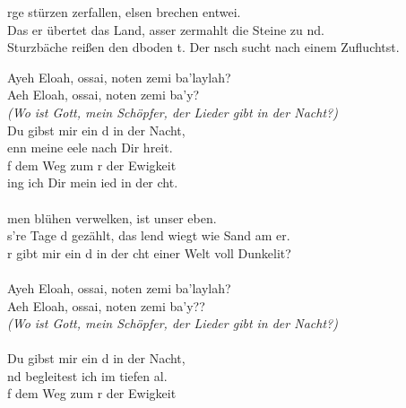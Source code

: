 
rge stürzen  zerfallen, elsen brechen entwei.\\
Das er übertet das Land, asser zermahlt die Steine zu nd.\\
Sturzbäche reißen den dboden t. Der nsch sucht nach einem Zufluchtst.\\
\begin{tabbing}
Ayeh Eloah, ossai, noten zemi ba'laylah? \\
Aeh Eloah, ossai, noten zemi ba'y?\\
\hspace{90px} \= \textit{(Wo ist Gott, mein Schöpfer, der Lieder gibt in der Nacht?)}\\
Du gibst mir ein d in der Nacht,\\
enn meine eele nach Dir hreit.\\
f dem Weg zum r der Ewigkeit\\
ing ich Dir mein ied in der cht.\\
\\
men blühen  verwelken,  ist unser eben.\\
s're Tage d gezählt, das lend wiegt wie Sand am er.\\
r gibt mir ein d in der cht einer Welt voll Dunkelit?\\
\\
Ayeh Eloah, ossai, noten zemi ba'laylah?\\
Aeh Eloah, ossai, noten zemi ba'y??\\
\> \textit{(Wo ist Gott, mein Schöpfer, der Lieder gibt in der Nacht?)}\\
\\
Du gibst mir ein d in der Nacht,\\
nd begleitest ich im tiefen al.\\
f dem Weg zum r der Ewigkeit\\

\end{tabbing}
